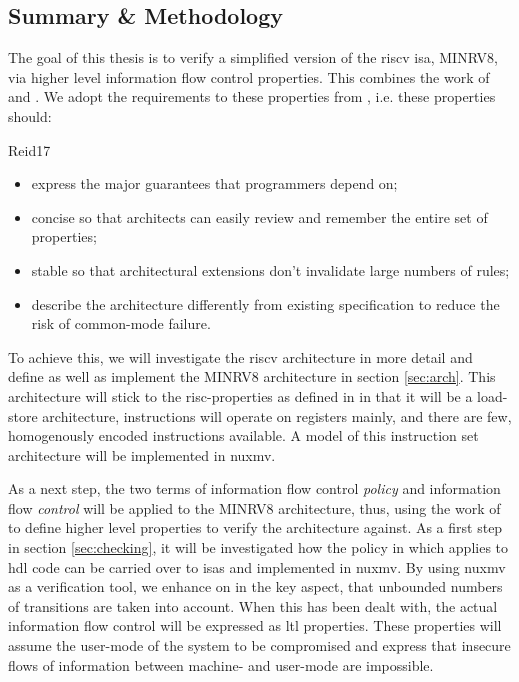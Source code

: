 \subsection{Summary \& Methodology}
\label{sec:sum-background}

The goal of this thesis is to verify a simplified version of the \gls{riscv} \gls{isa}, MINRV8, via higher level information flow control properties.
This combines the work of \citeauthor{Reid17} \cite{Reid17} and \citeauthor{Ferraiuolo17} \cite{Ferraiuolo17}.
We adopt the requirements to these properties from \cite{Reid17}, i.e. these properties should:
\begin{displaycquote}[pp.88:2-3]{Reid17}
    \begin{itemize}
        \item express the major guarantees that programmers depend on;
        \item {} concise so that architects can easily review and remember the entire set of properties;
        \item {} stable so that architectural extensions don't invalidate large numbers of rules;
        \item \textelp{} describe the architecture differently from existing specification to reduce the risk of common-mode failure.
    \end{itemize}
\end{displaycquote}

To achieve this, we will investigate the \gls{riscv} architecture in more detail and define as well as implement the MINRV8 architecture in section \ref{sec:arch}.
This architecture will stick to the \gls{risc}-properties as defined in \cite{Hennessy12} in that it will be a load-store architecture, instructions will operate on registers mainly, and there are few, homogenously encoded instructions available.
A model of this instruction set architecture will be implemented in \gls{nuxmv}.

As a next step, the two terms of information flow control \textit{policy} and information flow \textit{control} will be applied to the MINRV8 architecture, thus, using the work of \citeauthor{Ferraiuolo17} \cite{Ferraiuolo17} to define higher level properties to verify the architecture against.
As a first step in section \ref{sec:checking}, it will be investigated how the policy in \cite{Ferraiuolo17} which applies to \gls{hdl} code can be carried over to \glspl{isa} and implemented in \gls{nuxmv}.
By using \gls{nuxmv} as a verification tool, we enhance on \cite{Reid17} in the key aspect, that unbounded numbers of transitions are taken into account.
When this has been dealt with, the actual information flow control will be expressed as \gls{ltl} properties.
These properties will assume the user-mode of the system to be compromised and express that insecure flows of information between machine- and user-mode are impossible.

